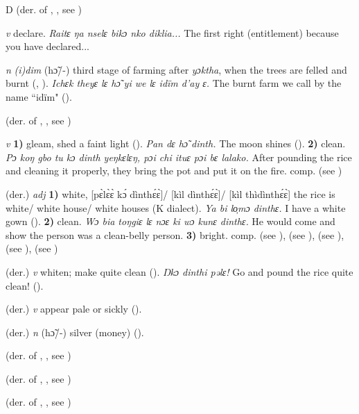 \begin{letter}{D}
 (der. of , , see ) 

 \textit{v} declare. \textit{Raitɛ ŋa nselɛ bikɔ nko diklia...} The first right (entitlement) because you have declared...

 \textit{n} \textit{(i)dim} (hɔ̃/-) third stage of farming after \textit{yɔktha}, when the trees are felled and burnt (\citealt{Pichl1967}, \citealt{Sumner1921}). \textit{Ichɛk theyɛ lɛ hɔ̃ yi we lɛ idïm d'ay ɛ.} The burnt farm we call by the name “idïm" (\citealt{Pichl1967}). 

 (der. of , , see )

 \textit{v} \textbf{1)} gleam, shed a faint light (\citealt{Pichl1967}). \textit{Pan dɛ hɔ̃ dinth.} The moon shines (\citealt{Pichl1967}). \textbf{2)} clean. \textit{Pɔ koŋ gbo tu kɔ dinth yeŋkɛlɛŋ, pɔi chi ituɛ pɔi bɛ lalako.} After pounding the rice and cleaning it properly, they bring the pot and put it on the fire. comp.  (see ) 

 (der.) \textit{adj} \textbf{1)} white, [pɛ̀lɛ̀ɛ̀ kɔ́ dìnthɛ́ɛ̀]/ [kìl dìnthɛ́ɛ̀]/ [kìl thìdìnthɛ́ɛ̀] the rice is white/ white house/ white houses (K dialect). \textit{Ya bi lo̹mɔ dinthɛ.} I have a white gown (\citealt{Pichl1967}). \textbf{2)} clean. \textit{Wɔ bia toŋgiɛ lɛ nɔɛ ki wɔ kunɛ dinthɛ.} He would come and show the person was a clean-belly person. \textbf{3)} bright. comp.  (see ),  (see ),  (see ),  (see ),  (see )

 (der.) \textit{v} whiten; make quite clean (\citealt{Pichl1967}). \textit{Ŋkɔ dinthi pəlɛ!} Go and pound the rice quite clean! (\citealt{Pichl1967}). 

 (der.) \textit{v} appear pale or sickly (\citealt{Pichl1967}). 

 (der.) \textit{n} (hɔ̃/-) silver (money) (\citealt{Pichl1967}). 

 (der. of , , see ) 

 (der. of , , see ) 

 (der. of , , see ) 


\end{letter}

